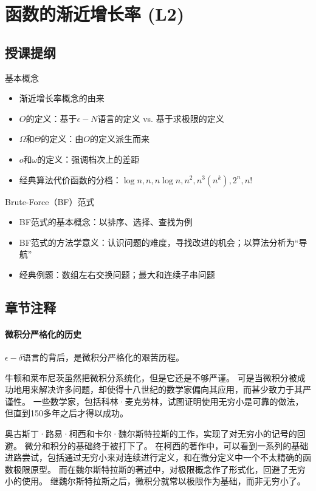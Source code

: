 \chapter{函数的渐近增长率 (L2)}

\section*{授课提纲}

\nid 基本概念
\begin{itemize}
    \item 渐近增长率概念的由来
    \item $O$的定义：基于$\epsilon-N$语言的定义 vs. 基于求极限的定义
    \item $\Omega$和$\Theta$的定义：由$O$的定义派生而来
    \item $o$和$\omega$的定义：强调档次上的差距
    \item 经典算法代价函数的分档：$\log n, n, n\log n, n^2, n^3(n^k), 2^n, n!$
\end{itemize}

\nid Brute-Force（BF）范式
\begin{itemize}
    \item BF范式的基本概念：以排序、选择、查找为例
    \item BF范式的方法学意义：认识问题的难度，寻找改进的机会；以算法分析为“导航”
    \item 经典例题：数组左右交换问题；最大和连续子串问题
\end{itemize}

\section*{章节注释}

\subsubsection{微积分严格化的历史}

$\epsilon-\delta$语言的背后，是微积分严格化的艰苦历程。

牛顿和莱布尼茨虽然把微积分系统化，但是它还是不够严谨。
可是当微积分被成功地用来解决许多问题，却使得十八世纪的数学家偏向其应用，而甚少致力于其严谨性。
一些数学家，包括科林·麦克劳林，试图证明使用无穷小是可靠的做法，但直到150多年之后才得以成功。

奥古斯丁·路易·柯西和卡尔·魏尔斯特拉斯的工作，实现了对无穷小的记号的回避。
微分和积分的基础终于被打下了。
在柯西的著作中，可以看到一系列的基础进路尝试，包括通过无穷小来对连续进行定义，和在微分定义中一个不太精确的函数极限原型。
而在魏尔斯特拉斯的著述中，对极限概念作了形式化，回避了无穷小的使用。
继魏尔斯特拉斯之后，微积分就常以极限作为基础，而非无穷小了。